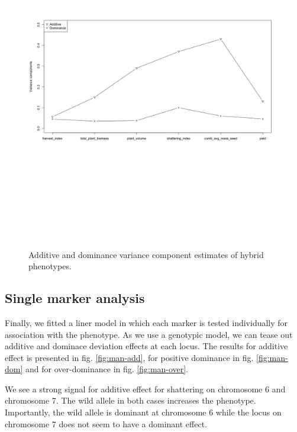 \begin{figure}
    \centering
    \includegraphics[height = 15cm, width = 15cm]{tex/chickpea/varcomp.jpeg}
    \caption{Additive and dominance variance component estimates of hybrid phenotypes.}
    \label{fig:varcomp}
\end{figure}

\subsection{Single marker analysis}

Finally, we fitted a liner model in which each marker is tested individually for association with the phenotype. As we use a genotypic model, we can tease out additive and dominace deviation effects at each locus. The results for additive effect is presented in fig. \ref{fig:man-add}, for positive dominance in fig. \ref{fig:man-dom} and for over-dominance in fig. \ref{fig:man-over}. 

We see a strong signal for additive effect for shattering on chromosome 6 and chromosome 7. The wild allele in both cases increases the phenotype. Importantly, the wild allele is dominant at chromosome 6 while the locus on chromosome 7 does not seem to have a dominant effect. 

